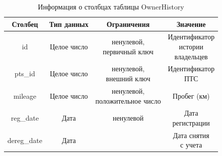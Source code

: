
\begin{table}[H]
    \begin{center}
        \caption{Информация о столбцах таблицы OwnerHistory}
        \begin{tabular}{|c|c|c|c|}
            \hline
            Столбец & Тип данных & Ограничения & Значение \\
            \hline
            id & Целое число & \makecell{ненулевой, \\ первичный ключ} & \makecell{Идентификатор \\ истории \\ владельцев} \\
            \hline
            pts\_id & Целое число & \makecell{ненулевой, \\ внешний ключ} & \makecell{Идентификатор \\ ПТС} \\
            \hline
            mileage & Целое число & \makecell{ненулевой, \\ положительное число} & Пробег (км) \\
            \hline
            reg\_date & Дата & ненулевой & \makecell{Дата \\ регистрации} \\
            \hline
            dereg\_date & Дата & & \makecell{Дата снятия \\ с учета} \\
            \hline
        \end{tabular}
        \label{table:db:owner_history}
    \end{center}
\end{table}


